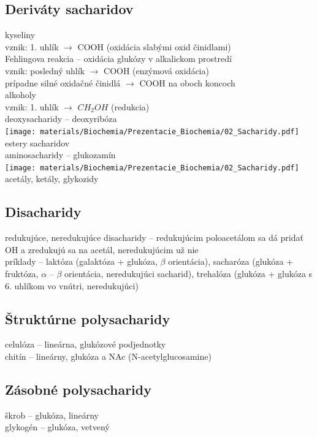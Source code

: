\subsection{Deriváty sacharidov}
kyseliny\\
\tab vznik: 1. uhlík $\rightarrow$ COOH (oxidácia slabými oxid činidlami)\\
\tab Fehlingova reakcia -- oxidácia glukózy v alkalickom prostredí\\
\tab vznik: posledný uhlík $\rightarrow$ COOH (enzýmová oxidácia)\\
\tab prípadne silné oxidačné činidlá $\rightarrow$ COOH na oboch koncoch\\
alkoholy\\
\tab vznik: 1. uhlík $\rightarrow$ $CH_2OH$ (redukcia)\\
deoxysacharidy -- deoxyribóza\\
\texttt{[image: materials/Biochemia/Prezentacie\_Biochemia/02\_Sacharidy.pdf]}\\
estery sacharidov\\
aminosacharidy -- glukozamín\\
\texttt{[image: materials/Biochemia/Prezentacie\_Biochemia/02\_Sacharidy.pdf]}\\
acetály, ketály, glykozidy\\
\subsection{Disacharidy}
redukujúce, neredukujúce disacharidy -- redukujúcim poloacetálom sa dá pridať OH a zredukujú sa na acetál, neredukujúcim už nie\\
príklady -- laktóza (galaktóza + glukóza, $\beta$ orientácia), sacharóza (glukóza + fruktóza, $\alpha$ -- $\beta$ orientácia, neredukujúci sacharid), trehalóza (glukóza + glukóza s 6. uhlíkom vo vnútri, neredukujúci)\\
\subsection{Štruktúrne polysacharidy}
celulóza -- lineárna, glukózové podjednotky\\
chitín -- lineárny, glukóza a NAc (N-acetylglucosamine)\\
\subsection{Zásobné polysacharidy}
škrob -- glukóza, lineárny\\
glykogén -- glukóza, vetvený\\
